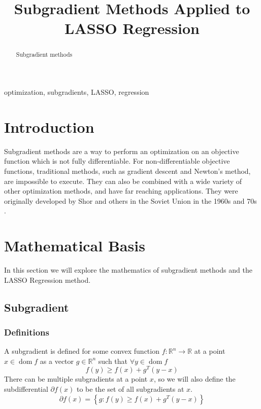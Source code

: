 \documentclass[conference]{IEEEtran}
\DeclareMathOperator{\dom}{dom}
\begin{document}
\title{
Subgradient Methods Applied to LASSO Regression
}

\author{
}


\maketitle

\begin{abstract}
Subgradient methods
\end{abstract}

\begin{IEEEkeywords}
optimization, subgradients, LASSO, regression
\end{IEEEkeywords}

\section{Introduction}\label{sec:intro}
Subgradient methods are a way to perform an optimization on an objective function which is not fully differentiable. For non-differentiable objective functions, traditional methods, such as gradient descent and Newton's method, are impossible to execute. They can also be combined with a wide variety of other optimization methods, and have far reaching applications. They were originally developed by Shor and others in the Soviet Union in the 1960s and 70s \cite{boydparksubgradients}.


\section{Mathematical Basis}\label{sec:math}
In this section we will explore the mathematics of subgradient methods and the LASSO Regression method.
\subsection{Subgradient}\label{sec:math subgrad}
\subsubsection{Definitions}
A subgradient is defined for some convex function \(f: \mathbb{R}^n \rightarrow \mathbb{R}\) at a point \(x \in \dom f\) as a vector \(g \in \mathbb{R}^n\) such that \(\forall y \in \dom f\)
\begin{equation}\label{eq:subgradient def}
f(y) \geq f(x) + g^T (y-x) 
\end{equation}
There can be multiple subgradients at a point \(x\), so we will also define the subdifferential \(\partial f(x)\) to be the set of all subgradients at \(x\).
\begin{equation}\label{eq:math subdifferential}
\partial f(x) = \left\{ g : f(y) \geq f(x) + g^T (y-x)\right\}
\end{equation}
\end{document}
